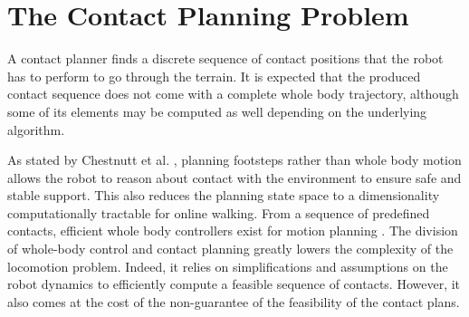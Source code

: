 

\section{The Contact Planning Problem \label{sota2}}



A contact planner finds a discrete sequence of contact positions that the robot has to perform to go through the terrain.
It is expected that the produced contact sequence does not come with a complete whole body trajectory, although some of its elements may be computed as well depending on the underlying algorithm.

As stated by Chestnutt et al. \cite{chestnutt_2009_interactive_guide}, planning footsteps rather than whole body motion allows the robot to reason about contact with the environment to ensure safe and stable support. This also reduces the planning state space to a dimensionality computationally tractable for online walking.
From a sequence of predefined contacts, efficient whole body controllers exist for motion planning \cite{carpentier2016_versatile_efficient, caron_2018_whole_body, pierre_alexandre_2021, ewen_2022}.
The division of whole-body control and contact planning greatly lowers the complexity of the locomotion problem. Indeed, it relies on simplifications and assumptions on the robot dynamics to efficiently compute a feasible sequence of contacts.
However, it also comes at the cost of the non-guarantee of the feasibility of the contact plans. 

